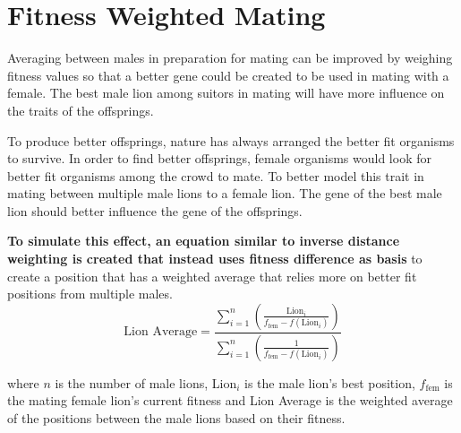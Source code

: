 \section{Fitness Weighted Mating}
\par Averaging between males in preparation for mating can be improved by weighing fitness values so that a better gene could be created to be used in mating with a female. The best male lion among suitors in mating will have more influence on the traits of the offsprings.

\par To produce better offsprings, nature has always arranged the better fit organisms to survive. In order to find better offsprings, female organisms would look for better fit organisms among the crowd to mate. To better model this trait in mating between multiple male lions to a female lion. The gene of the best male lion should better influence the gene of the offsprings.

\par \textbf{To simulate this effect, an equation similar to inverse distance weighting \cite{idw} is created that instead uses fitness difference as basis} to create a position that has a weighted average that relies more on better fit positions from multiple males.
$$
\text{Lion Average} = \frac{\displaystyle\sum_{i=1}^{n} \left( \frac{\text{Lion}_i}{f_{\text{fem}} - f(\text{Lion}_i)} \right)}{\displaystyle\sum_{i=1}^{n} \left( \frac{1}{f_{\text{fem}} - f(\text{Lion}_i)} \right)}
$$

where $n$ is the number of male lions, Lion$_i$ is the male lion's best position, $f_{\text{fem}}$ is the mating female lion's current fitness and Lion Average is the weighted average of the positions between the male lions based on their fitness.
